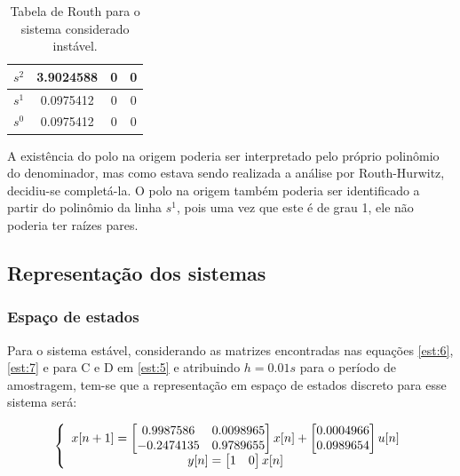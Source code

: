 \begin{table}[h]
\centering
\caption{Tabela de Routh para o sistema considerado instável.}\label{table:routh:ins}
\begin{tabular}{l|ccc}
 $s^2$ & 3.9024588 & 0 & 0 \\ \hline
 $s^1$ & 0.0975412 & 0 & 0 \\ \hline
 $s^0$ & 0.0975412 & 0 & 0 \\ \hline
\end{tabular}
\end{table}

A existência do polo na origem poderia ser interpretado pelo próprio polinômio do denominador, mas como estava sendo realizada a análise por Routh-Hurwitz, decidiu-se completá-la. O polo na origem também poderia ser identificado a partir do polinômio da linha $s^1$, pois uma vez que este é de grau 1, ele não poderia ter raízes pares.

\subsection{Representação dos sistemas}

\subsubsection{Espaço de estados}

Para o sistema estável, considerando as matrizes encontradas nas equações \ref{est:6}, \ref{est:7} e para C e D em \ref{est:5} e atribuindo $h = 0.01 s$ para o período de amostragem, tem-se que a representação em espaço de estados discreto para esse sistema será:

\begin{equation} \label{ss:est}
\centering
\left \{
\begin{array}{cc}
x[n+1] = \begin{bmatrix} 0.9987586 & 0.0098965 \\ -0.2474135 & 0.9789655 \end{bmatrix} x[n] + \begin{bmatrix} 0.0004966 \\ 0.0989654 \end{bmatrix} u[n] \\
y[n] = \begin{bmatrix} 1 & 0  \end{bmatrix} x[n] \\
\end{array}
\right.
\end{equation}


